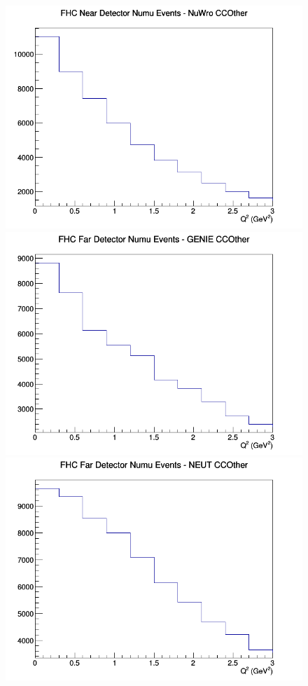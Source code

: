 \begin{figure}[h]
\includegraphics[width=\linewidth]{eff_Q2/LAr/CCOther_FHC_ND_numu_Q2_NuWro.png}
\endminipage
\newline
{}
\includegraphics[width=\linewidth]{eff_Q2/LAr/CCOther_FHC_FD_numu_Q2_GENIE.png}
\endminipage
{}
\includegraphics[width=\linewidth]{eff_Q2/LAr/CCOther_FHC_FD_numu_Q2_NEUT.png}

\end{figure}
